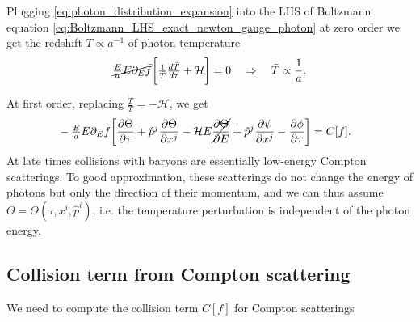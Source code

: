 Plugging \eqref{eq:photon_distribution_expansion} into the LHS of Boltzmann equation \eqref{eq:Boltzmann_LHS_exact_newton_gauge_photon} at zero order we get the redshift $T\propto a^{-1}$ of photon temperature
{\small
\begin{align}\label{eq:Boltzmann_LHS_photon_zero_order}
\begin{aligned}
    &\cancel{\tfrac{E}{a}E\partial_E\bar{f}}\bigg[\tfrac{1}{\bar{T}}\tfrac{d\bar{T}}{d\tau}+\mathcal{H}\bigg]=0 \quad \Rightarrow \quad \bar{T}\propto \frac{1}{a}.\\[3pt]
\end{aligned}
\end{align}}
At first order, replacing $\frac{\dot{T}}{T}=-\mathcal{H}$, we get
{\small
\begin{align}\label{eq:Boltzmann_LHS_photon_first_order_newtonian}
\begin{aligned}
    &-\tfrac{E}{a}E\partial_E\bar{f}\bigg[\frac{\partial\Theta}{\partial \tau}+\hat{p}^j\frac{\partial\Theta}{\partial x^j}-\mathcal{H}E\cancel{\frac{\partial \Theta}{\partial E}}+\hat{p}^j\frac{\partial\psi}{\partial x^j}-\frac{\partial \phi}{\partial\tau}\bigg] = C[f].
\end{aligned}
\end{align}}
At late times collisions with baryons are essentially low-energy Compton scatterings.
To good approximation, these scatterings do not change the energy of photons but only the direction of their momentum, and we can thus assume $\Theta=\Theta(\tau, x^i, \hat{p}^i)$, i.e. the temperature perturbation is independent of the photon energy.

\subsection{Collision term from Compton scattering}
We need to compute the collision term $C[f]$ for Compton scatterings


